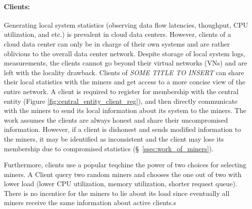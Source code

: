 \documentclass{article}
\newcommand{\projTitle}{SOME TITLE TO INSERT}
\begin{document}
\paragraph{Clients:} Generating local system statistics (observing data flow latencies, thoughput, CPU utilization, and etc.) is prevalent in cloud data centers. However, clients of a cloud data center can only be in charge of their own systems and are rather oblivious to the overall data center network. Despite storage of local system logs, measurements, the clients cannot go beyond their virtual networks (VNs) and are left with the locality drawback. Clients of \textit{\projTitle} can share their local statistics with the miners and get access to a more concise view of the entire network. A client is required to register for membership with the central entity (Figure \ref{fig:central_entity_client_reg}), and then directly communicate with the miners to send its local information about its system to the miners. The work assumes the clients are always honest and share their uncompromised information. However, if a client is dishonest and sends modified information to the miners, it may be identified as inconsistent and the client may lose its membership due to compromised statistics (\S\ \ref{ssec:work_of_miners}). 

\noindent \newline Furthermore, clients use a popular teqchine the power of two choices \cite{power_of_two_choices} for selecting  miners. A Client query two random miners and chooses the one out of two with lower load (lower CPU utilization, memory utilization, shorter request queue). There is no incentice for the miners to lie about its load since eventually all miners receive the same information about active clients.s  
\par       
\end{document}
